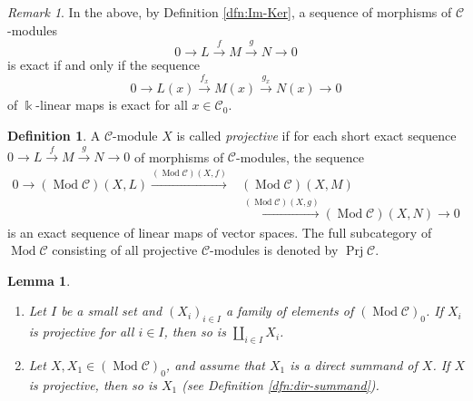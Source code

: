 \documentclass{surv-l}
\numberwithin{equation}{chapter}
\numberwithin{figure}{chapter}
\theoremstyle{plain}
\newtheorem{lem}[thm]{Lemma}
\theoremstyle{definition}
\newtheorem{dfn}[thm]{Definition}
\theoremstyle{remark}
\newtheorem{rmk}[thm]{Remark}
\DeclareMathOperator{\Mod}{Mod}
\DeclareMathOperator{\Prj}{Prj}
\begin{document}
\begin{rmk}\label{rmk:exactness-pointwise}
In the above, by Definition \ref{dfn:Im-Ker},
a sequence of morphisms of \({\mathcal{C}}\)-modules
\[
0 \to L \xrightarrow{f} M \xrightarrow{g} N \to 0
\]
is exact if and only if the sequence
\[
0 \to L(x) \xrightarrow{f_x} M(x) \xrightarrow{g_x} N(x) \to 0
\]
of $\Bbbk$-linear maps is exact for all $x \in {\mathcal{C}}_0$.
\end{rmk}

\begin{dfn}
A ${\mathcal{C}}$-module $X$ is called \emph{projective} if
for each short exact sequence $0 \to L \xrightarrow{f} M \xrightarrow{g} N \to 0$
of morphisms of \({\mathcal{C}}\)-modules, the sequence
\begin{equation*}
\begin{aligned}
0 \to (\Mod{\mathcal{C}})(X, L) \xrightarrow{(\Mod{\mathcal{C}})(X, f)} &(\Mod{\mathcal{C}})(X, M)\\
 &\xrightarrow{(\Mod{\mathcal{C}})(X, g)} (\Mod{\mathcal{C}})(X, N) \to 0
\end{aligned}
\end{equation*}
is an exact sequence of linear maps of vector spaces.
The full subcategory of $\Mod{\mathcal{C}}$ consisting of
all projective ${\mathcal{C}}$-modules is denoted by $\Prj {\mathcal{C}}$.
\end{dfn}

\begin{lem}\leavevmode
\label{lem:proj-direct-sum}
\begin{enumerate}
\item
Let $I$ be a small set and $(X_i)_{i\in I}$ a family of elements of $(\Mod{\mathcal{C}})_0$.
If $X_i$ is projective for all $i \in I$, then so is $\coprod_{i \in I} X_i$.
\item
Let $X, X_1 \in (\Mod{\mathcal{C}})_0$, and assume that $X_1$ is a direct summand of $X$.
If $X$ is projective, then so is $X_1$ {\em (see Definition \ref{dfn:dir-summand})}.
\end{enumerate}
\end{lem}
\end{document}
